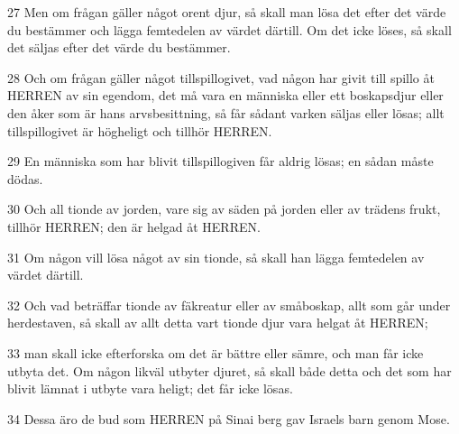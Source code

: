 \par 27 Men om frågan gäller något orent djur, så skall man lösa det efter det värde du bestämmer och lägga femtedelen av värdet därtill. Om det icke löses, så skall det säljas efter det värde du bestämmer.
\par 28 Och om frågan gäller något tillspillogivet, vad någon har givit till spillo åt HERREN av sin egendom, det må vara en människa eller ett boskapsdjur eller den åker som är hans arvsbesittning, så får sådant varken säljas eller lösas; allt tillspillogivet är högheligt och tillhör HERREN.
\par 29 En människa som har blivit tillspillogiven får aldrig lösas; en sådan måste dödas.
\par 30 Och all tionde av jorden, vare sig av säden på jorden eller av trädens frukt, tillhör HERREN; den är helgad åt HERREN.
\par 31 Om någon vill lösa något av sin tionde, så skall han lägga femtedelen av värdet därtill.
\par 32 Och vad beträffar tionde av fäkreatur eller av småboskap, allt som går under herdestaven, så skall av allt detta vart tionde djur vara helgat åt HERREN;
\par 33 man skall icke efterforska om det är bättre eller sämre, och man får icke utbyta det. Om någon likväl utbyter djuret, så skall både detta och det som har blivit lämnat i utbyte vara heligt; det får icke lösas.
\par 34 Dessa äro de bud som HERREN på Sinai berg gav Israels barn genom Mose.


